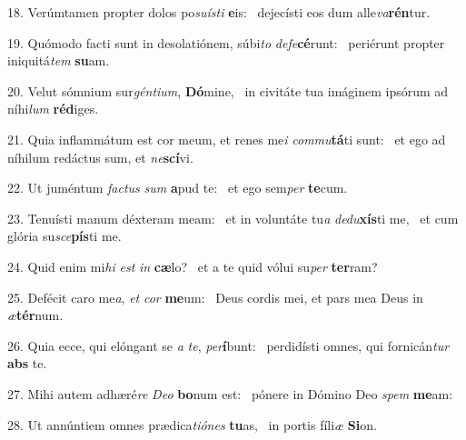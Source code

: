 18. Verúmtamen propter dolos po\textit{su}\textit{ís}\textit{ti} \textbf{e}is: \ast\  dejecísti eos dum alle\textit{va}\textbf{rén}tur.\

19. Quómodo facti sunt in desolatiónem, súbi\textit{to} \textit{de}\textit{fe}\textbf{cé}runt: \ast\  periérunt propter iniquitá\textit{tem} \textbf{su}am.\

20. Velut sómnium sur\textit{gén}\textit{ti}\textit{um}, \textbf{Dó}mine, \ast\  in civitáte tua imáginem ipsórum ad níhi\textit{lum} \textbf{réd}iges.\

21. Quia inflammátum est cor meum, et renes me\textit{i} \textit{com}\textit{mu}\textbf{tá}ti sunt: \ast\  et ego ad níhilum redáctus sum, et \textit{ne}\textbf{scí}vi.\

22. Ut juméntum \textit{fac}\textit{tus} \textit{sum} \textbf{a}pud te: \ast\  et ego sem\textit{per} \textbf{te}cum.\

23. Tenuísti manum déxteram meam: \dag\  et in voluntáte tu\textit{a} \textit{de}\textit{du}\textbf{xís}ti me, \ast\  et cum glória su\textit{sce}\textbf{pís}ti me.\

24. Quid enim mi\textit{hi} \textit{est} \textit{in} \textbf{cæ}lo? \ast\  et a te quid vólui su\textit{per} \textbf{ter}ram?\

25. Defécit caro me\textit{a}, \textit{et} \textit{cor} \textbf{me}um: \ast\  Deus cordis mei, et pars mea Deus in \textit{æ}\textbf{tér}num.\

26. Quia ecce, qui elóngant se \textit{a} \textit{te}, \textit{per}\textbf{í}bunt: \ast\  perdidísti omnes, qui fornicán\textit{tur} \textbf{abs} te.\

27. Mihi autem adhæré\textit{re} \textit{De}\textit{o} \textbf{bo}num est: \ast\  pónere in Dómino Deo \textit{spem} \textbf{me}am:\

28. Ut annúntiem omnes prædica\textit{ti}\textit{ó}\textit{nes} \textbf{tu}as, \ast\  in portis fíli\textit{æ} \textbf{Si}on.\

